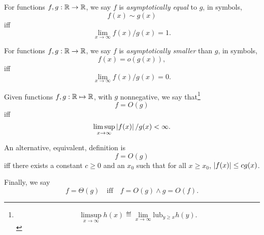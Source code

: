 \documentclass[11pt,twoside]{article}
\begin{document}
For functions $f,g: \mathbb{R} \to \mathbb{R}$, we say $f$ is \emph{asymptotically
equal} to $g$, in symbols,
\[
f(x) \sim g(x)
\]
iff
\[
\lim_{x \rightarrow \infty} f(x)/g(x) = 1.
\]

For functions $f,g: \mathbb{R} \to \mathbb{R}$, we say $f$ is \emph{asymptotically
smaller} than $g$, in symbols,
\[
f(x) = o(g(x)),
\]
iff
\[
\lim_{x \rightarrow \infty} f(x)/g(x) = 0.
\]

Given functions $f, g : \mathbb{R} \mapsto \mathbb{R}$, with $g$ nonnegative, we
say that\footnote{
\[
\limsup_{x \rightarrow \infty} h(x) \eqdef \lim_{x \rightarrow \infty}
\text{lub}_{y \geq x} h(y).
\]}
\[
f = O(g)
\]
iff
\[
\limsup_{x \rightarrow \infty} \left|f(x)\right|/g(x) < \infty.
\]

An alternative, equivalent, definition is
\[
f = O(g)
\]
iff there exists a constant $c \geq 0$ and an $x_0$ such that for all $x \geq
x_0$, $\left|f(x)\right| \leq c g(x)$.

Finally, we say
\[
f = \Theta(g) \quad\text{iff}\quad f=O(g) \land g=O(f).
\]
\end{document}
